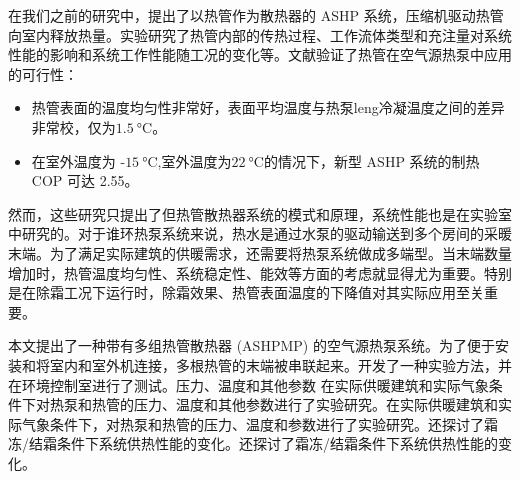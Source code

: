 在我们之前的研究中，提出了以热管作为散热器的 ASHP 系统，压缩机驱动热管向室内释放热量。实验研究了热管内部的传热过程、工作流体类型和充注量对系统性能的影响和系统工作性能随工况的变化等。文献验证了热管在空气源热泵中应用的可行性：
\begin{itemize}
    \item 热管表面的温度均匀性非常好，表面平均温度与热泵leng冷凝温度之间的差异非常校，仅为$\qty{1.5}{\degreeCelsius}$。
    \item 在室外温度为 -$\qty{15}{\degreeCelsius}$,室外温度为$\qty{22}{\degreeCelsius}$的情况下，新型 ASHP 系统的制热 COP 可达 2.55。
\end{itemize}

然而，这些研究只提出了但热管散热器系统的模式和原理，系统性能也是在实验室中研究的。对于谁环热泵系统来说，热水是通过水泵的驱动输送到多个房间的采暖末端。为了满足实际建筑的供暖需求，还需要将热泵系统做成多端型。当末端数量增加时，热管温度均匀性、系统稳定性、能效等方面的考虑就显得尤为重要。特别是在除霜工况下运行时，除霜效果、热管表面温度的下降值对其实际应用至关重要。

本文提出了一种带有多组热管散热器 (ASHPMP) 的空气源热泵系统。为了便于安装和将室内和室外机连接，多根热管的末端被串联起来。开发了一种实验方法，并在环境控制室进行了测试。压力、温度和其他参数
在实际供暖建筑和实际气象条件下对热泵和热管的压力、温度和其他参数进行了实验研究。在实际供暖建筑和实际气象条件下，对热泵和热管的压力、温度和参数进行了实验研究。还探讨了霜冻/结霜条件下系统供热性能的变化。还探讨了霜冻/结霜条件下系统供热性能的变化。

